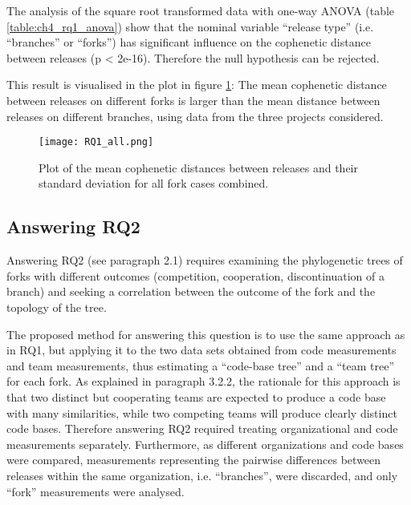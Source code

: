 The analysis of the square root transformed data with one-way ANOVA (table \ref{table:ch4_rq1_anova}) show that the nominal variable “release type” (i.e. “branches” or “forks”) has significant influence on the cophenetic distance between releases (p < 2e-16). Therefore the null hypothesis can be rejected.



This result is visualised in the plot in figure \ref{fig:rq1_all}: The mean cophenetic distance between releases on different forks is larger than the mean distance between releases on different branches, using data from the three projects considered.

\begin{figure}[H]
  \texttt{[image: RQ1\_all.png]}
  \caption{Plot of the mean cophenetic distances between releases and their standard deviation for all fork cases combined.}
  \label{fig:rq1_all}
\end{figure}

\subsection{Answering RQ2}
Answering RQ2 (see paragraph 2.1) requires examining the phylogenetic trees of forks with different outcomes (competition, cooperation, discontinuation of a branch) and seeking a correlation between the outcome of the fork and the topology of the tree.

The proposed method for answering this question is to use the same approach as in RQ1, but applying it to the two data sets obtained from code measurements and team measurements, thus estimating a “code-base tree” and a “team tree” for each fork. As explained in paragraph 3.2.2, the rationale for this approach is that two distinct but cooperating teams are expected to produce a code base with many similarities, while two competing teams will produce clearly distinct code bases. Therefore answering RQ2 required treating organizational and code measurements separately. Furthermore, as different organizations and code bases were compared, measurements representing the pairwise differences between releases within the same organization, i.e. “branches”, were discarded, and only “fork” measurements were analysed.

